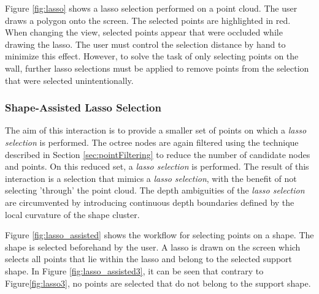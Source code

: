 Figure \ref{fig:lasso} shows a lasso selection performed on a point cloud. The user draws a polygon onto the screen. The selected points are highlighted in red. When changing the view, selected points appear that were occluded while drawing the lasso. The user must control the selection distance by hand to minimize this effect. However, to solve the task of only selecting points on the wall, further lasso selections must be applied to remove points from the selection that were selected unintentionally. 


\subsubsection{Shape-Assisted Lasso Selection}

The aim of this interaction is to provide a smaller set of points on which a \textit{lasso selection} is performed.  The octree nodes are again filtered using the technique described in Section \ref{sec:pointFiltering} to reduce the number of candidate nodes and points. On this reduced set, a \textit{lasso selection} is performed. The result of this interaction is a selection that mimics a \textit{lasso selection}, with the benefit of not selecting 'through' the point cloud. The depth ambiguities of the \textit{lasso selection} are circumvented by introducing continuous depth boundaries defined by the local curvature of the shape cluster. 

Figure \ref{fig:lasso_assisted} shows the workflow for selecting points on a shape. The shape is selected beforehand by the user. A lasso is drawn on the screen which selects all points that lie within the lasso and belong to the selected support shape. In Figure \ref{fig:lasso_assisted3}, it can be seen that contrary to Figure\ref{fig:lasso3}, no points are selected that do not belong to the support shape.

